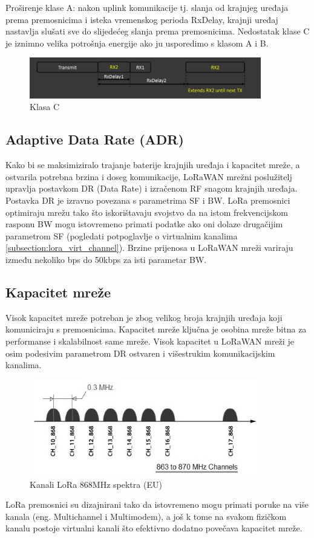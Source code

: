 \begin{itemize}
Proširenje klase A: nakon uplink komunikacije tj. slanja od krajnjeg uređaja prema premosnicima i isteka vremenskog perioda RxDelay, krajnji uređaj nastavlja slušati sve do slijedećeg slanja prema premosnicima. Nedostatak klase C je iznimno velika potrošnja energije ako ju usporedimo s klasom A i B.

\begin{figure}[ht!]
	\centering
	\includegraphics[width=0.9\textwidth]{images/c_class.png}
	\caption{Klasa C}
	\label{img:class_c}
\end{figure}
\end{itemize}

\subsection{Adaptive Data Rate (ADR)}
Kako bi se maksimiziralo trajanje baterije krajnjih uređaja i kapacitet mreže, a ostvarila potrebna brzina i doseg komunikacije, LoRaWAN mrežni poslužitelj upravlja postavkom DR (Data Rate) i izračenom RF snagom krajnjih uređaja. Postavka DR je izravno povezana s parametrima SF i BW. LoRa premosnici optimiraju mrežu tako što iskorištavaju svojstvo da na istom frekvencijskom rasponu BW mogu istovremeno primati podatke ako oni dolaze drugačijim parametrom SF (pogledati potpoglavlje o virtualnim kanalima \ref{subsection:lora_virt_channel}). Brzine prijenosa u LoRaWAN mreži variraju između nekoliko bps do 50kbps za isti parametar BW.

\subsection{Kapacitet mreže}
Visok kapacitet mreže potreban je zbog velikog broja krajnjih uređaja koji komuniciraju s premosnicima. Kapacitet mreže ključna je osobina mreže bitna za performanse i skalabilnost same mreže. Visok kapacitet u LoRaWAN mreži je osim podesivim parametrom DR ostvaren i višestrukim komunikacijskim kanalima.
\begin{figure}[ht!]
	\centering
	\includegraphics[width=0.9\textwidth]{images/lora_channels.jpg}
	\caption{Kanali LoRa 868MHz spektra (EU)}
	\label{img:channels}
\end{figure}
LoRa premosnici su dizajnirani tako da istovremeno mogu primati poruke na više kanala (eng. Multichannel i Multimodem), a još k tome na svakom fizičkom kanalu postoje virtualni kanali što efektivno dodatno povečava kapacitet mreže.

